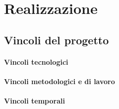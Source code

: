 \documentclass[Tesi.tex]{subfiles}
\begin{document}
\chapter{Realizzazione}




\section{Vincoli del progetto}
\subsubsection{Vincoli tecnologici}

\subsubsection{Vincoli metodologici e di lavoro}

\subsubsection{Vincoli temporali}
\end{document}
